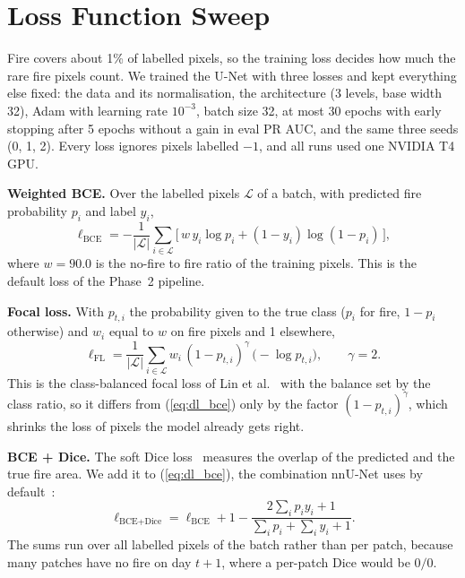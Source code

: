 
\section{Loss Function Sweep}
\label{sec:dl_loss}

Fire covers about 1\% of labelled pixels, so the training loss decides how much the rare fire pixels count.
We trained the U-Net with three losses and kept everything else fixed: the data and its normalisation, the
architecture (3 levels, base width 32), Adam with learning rate $10^{-3}$, batch size 32, at most 30 epochs
with early stopping after 5 epochs without a gain in eval PR AUC, and the same three seeds (0, 1, 2). Every
loss ignores pixels labelled $-1$, and all runs used one NVIDIA T4 GPU.

\textbf{Weighted BCE.} Over the labelled pixels $\mathcal{L}$ of a batch, with predicted fire probability
$p_i$ and label $y_i$,
\begin{equation}
\ell_{\text{BCE}} = -\frac{1}{|\mathcal{L}|}\sum_{i\in\mathcal{L}} \big[\, w\, y_i \log p_i + (1-y_i)\log(1-p_i) \,\big],
\label{eq:dl_bce}
\end{equation}
where $w = 90.0$ is the no-fire to fire ratio of the training pixels. This is the default loss of the
Phase~2 pipeline.

\textbf{Focal loss.} With $p_{t,i}$ the probability given to the true class ($p_i$ for fire, $1-p_i$
otherwise) and $w_i$ equal to $w$ on fire pixels and 1 elsewhere,
\begin{equation}
\ell_{\text{FL}} = \frac{1}{|\mathcal{L}|}\sum_{i\in\mathcal{L}} w_i\,(1-p_{t,i})^{\gamma}\,\big(-\log p_{t,i}\big),
\qquad \gamma = 2 .
\label{eq:dl_focal}
\end{equation}
This is the class-balanced focal loss of Lin et al.~\cite{lin2017} with the balance set by the class ratio,
so it differs from (\ref{eq:dl_bce}) only by the factor $(1-p_{t,i})^{\gamma}$, which shrinks the loss of
pixels the model already gets right.

\textbf{BCE + Dice.} The soft Dice loss~\cite{milletari2016} measures the overlap of the predicted and the
true fire area. We add it to (\ref{eq:dl_bce}), the combination nnU-Net uses by default~\cite{isensee2021}:
\begin{equation}
\ell_{\text{BCE+Dice}} = \ell_{\text{BCE}} + 1 - \frac{2\sum_i p_i y_i + 1}{\sum_i p_i + \sum_i y_i + 1} .
\label{eq:dl_dice}
\end{equation}
The sums run over all labelled pixels of the batch rather than per patch, because many patches have no fire
on day $t+1$, where a per-patch Dice would be $0/0$.

